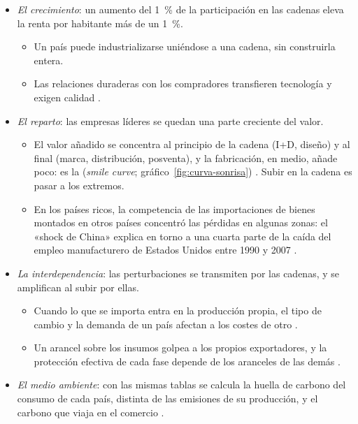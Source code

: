 \documentclass[11pt]{article}
\begin{document}
\begin{itemize}
\item \emph{El crecimiento}: un aumento del 1~\% de la participación en las cadenas eleva la renta por habitante más de un 1~\%\nocite{BM2020WDR}.
  \begin{itemize}
  \item Un país puede industrializarse uniéndose a una cadena, sin construirla entera.
  \item Las relaciones duraderas con los compradores transfieren tecnología y exigen calidad .
  \end{itemize}
\item \emph{El reparto}: las empresas líderes se quedan una parte creciente del valor.
  \begin{itemize}
  \item El valor añadido se concentra al principio de la cadena (I+D, diseño) y al final (marca, distribución, posventa), y la fabricación, en medio, añade poco: es la  (\emph{smile curve}; gráfico~\ref{fig:curva-sonrisa}) . Subir en la cadena es pasar a los extremos.
  \item En los países ricos, la competencia de las importaciones de bienes montados en otros países concentró las pérdidas en algunas zonas: el «shock de China» explica en torno a una cuarta parte de la caída del empleo manufacturero de Estados Unidos entre 1990 y 2007\nocite{AutorDornHanson2013China} .
  \end{itemize}
\item \emph{La interdependencia}: las perturbaciones se transmiten por las cadenas, y se amplifican al subir por ellas.
  \begin{itemize}
  \item Cuando lo que se importa entra en la producción propia, el tipo de cambio y la demanda de un país afectan a los costes de otro .
  \item Un arancel sobre los insumos golpea a los propios exportadores, y la protección efectiva de cada fase depende de los aranceles de las demás .
  \end{itemize}
\item \emph{El medio ambiente}: con las mismas tablas se calcula la huella de carbono del consumo de cada país, distinta de las emisiones de su producción, y el carbono que viaja en el comercio .
\end{itemize}
\end{document}
